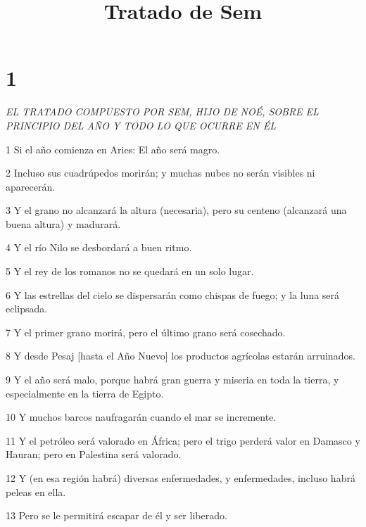 

\title{Tratado de Sem}

\chapter{1}

\par \textit{EL TRATADO COMPUESTO POR SEM, HIJO DE NOÉ, SOBRE EL PRINCIPIO DEL AÑO Y TODO LO QUE OCURRE EN ÉL}


\par 1 Si el año comienza en Aries: El año será magro.

\par 2 Incluso sus cuadrúpedos morirán; y muchas nubes no serán visibles ni aparecerán.

\par 3 Y el grano no alcanzará la altura (necesaria), pero su centeno (alcanzará una buena altura) y madurará.

\par 4 Y el río Nilo se desbordará a buen ritmo.

\par 5 Y el rey de los romanos no se quedará en un solo lugar.

\par 6 Y las estrellas del cielo se dispersarán como chispas de fuego; y la luna será eclipsada.

\par 7 Y el primer grano morirá, pero el último grano será cosechado.

\par 8 Y desde Pesaj [hasta el Año Nuevo] los productos agrícolas estarán arruinados.

\par 9 Y el año será malo, porque habrá gran guerra y miseria en toda la tierra, y especialmente en la tierra de Egipto.

\par 10 Y muchos barcos naufragarán cuando el mar se incremente.

\par 11 Y el petróleo será valorado en África; pero el trigo perderá valor en Damasco y Hauran; pero en Palestina será valorado.

\par 12 Y (en esa región habrá) diversas enfermedades, y enfermedades, incluso habrá peleas en ella.

\par 13 Pero se le permitirá escapar de él y ser liberado.

